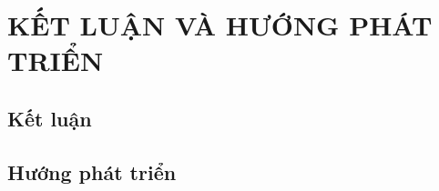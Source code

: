 \chapter{KẾT LUẬN VÀ HƯỚNG PHÁT TRIỂN}
\section{Kết luận}
\label{ss:ket_luan}

\section{Hướng phát triển}

